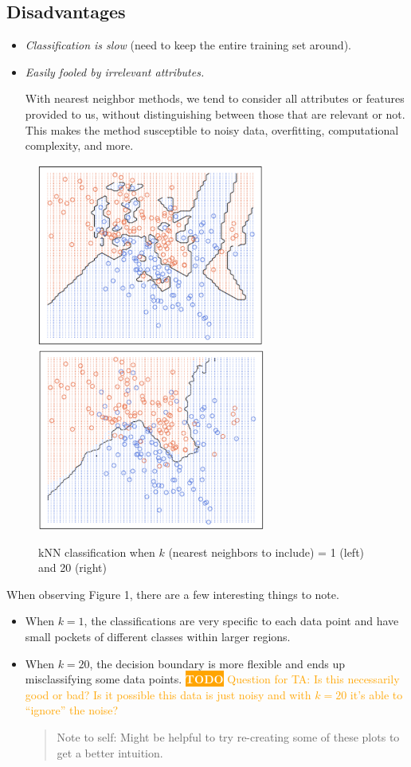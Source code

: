 \documentclass{report}
\newcommand{\todotext}[1]{\colorbox{orange}{\textcolor{white}{\textbf{TODO}}}}
\newcommand{\todo}[1]{\textsf{\todotext{} \textcolor{orange}{#1}}}
\begin{document}
\subsection{Disadvantages}
  \begin{itemize}
    \item \emph{Classification is slow} (need to keep the entire training set around).
    \item \emph{Easily fooled by irrelevant attributes.}
    
    With nearest neighbor methods, we tend to consider all attributes or
    features provided to us, without distinguishing between those that are
    relevant or not. This makes the method susceptible to noisy data,
    overfitting, computational complexity, and more.
  \end{itemize}
  \begin{figure}[h!]
    \centering
    \includegraphics[width=7.5cm]{1nn.png}
    \includegraphics[width=7.5cm]{20nn.png}
    \caption{kNN classification when \(k\) (nearest neighbors to include) = 1 (left) and 20 (right)}
  \end{figure}
  When observing Figure 1, there are a few interesting things to note. 
  \begin{itemize}
    \item When \(k = 1\), the classifications are very specific to each data point
    and have small pockets of different classes within larger regions. 
    \item When \(k = 20\), the decision boundary is more flexible and ends up misclassifying
    some data points.
    \todo{
      Question for TA: Is this necessarily good or bad? Is it possible this data
      is just noisy and with \(k = 20\) it's able to ``ignore'' the noise?
    }
    \begin{quote}
      Note to self: Might be helpful to try re-creating some of these plots to get a
      better intuition.
    \end{quote}
  \end{itemize}
\end{document}
